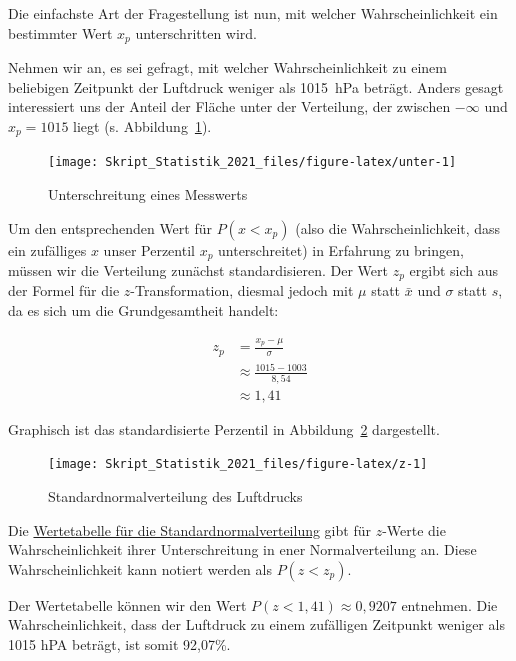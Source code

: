 \documentclass[
  11pt,
  ngerman,
  a4paper,
]{report}
\begin{document}
Die einfachste Art der Fragestellung ist nun, mit welcher Wahrscheinlichkeit ein bestimmter Wert \(x_p\) unterschritten wird.

Nehmen wir an, es sei gefragt, mit welcher Wahrscheinlichkeit zu einem beliebigen Zeitpunkt der Luftdruck weniger als 1015~hPa beträgt. Anders gesagt interessiert uns der Anteil der Fläche unter der Verteilung, der zwischen \(-\infty\) und \(x_p=1015\) liegt (s. Abbildung~\ref{fig:unter}).

\begin{figure}[H]

{\centering \texttt{[image: Skript\_Statistik\_2021\_files/figure-latex/unter-1]} 

}

\caption{Unterschreitung eines Messwerts}\label{fig:unter}
\end{figure}

Um den entsprechenden Wert für \(P(x < x_p)\) (also die Wahrscheinlichkeit, dass ein zufälliges \(x\) unser Perzentil \(x_p\) unterschreitet) in Erfahrung zu bringen, müssen wir die Verteilung zunächst standardisieren. Der Wert \(z_p\) ergibt sich aus der Formel für die \(z\)-Transformation, diesmal jedoch mit \(\mu\) statt \(\bar{x}\) und \(\sigma\) statt \(s\), da es sich um die Grundgesamtheit handelt:

\[\begin{aligned}
    z_p &= \frac{x_p-\mu}{\sigma} \\[4pt]
        &\approx \frac{1015-1003}{8{,}54}\\[4pt]
        &\approx 1{,}41
  \end{aligned}
\]

Graphisch ist das standardisierte Perzentil in Abbildung~\ref{fig:z} dargestellt.

\begin{figure}[H]

{\centering \texttt{[image: Skript\_Statistik\_2021\_files/figure-latex/z-1]} 

}

\caption{Standardnormalverteilung des Luftdrucks}\label{fig:z}
\end{figure}

Die \protect\hyperlink{tabelle-z}{Wertetabelle für die Standardnormalverteilung} gibt für \(z\)-Werte die Wahrscheinlichkeit ihrer Unterschreitung in ener Normalverteilung an. Diese Wahrscheinlichkeit kann notiert werden als \(P(z < z_p)\).

Der Wertetabelle können wir den Wert \(P(z < 1{,}41) \approx 0{,}9207\) entnehmen. Die Wahrscheinlichkeit, dass der Luftdruck zu einem zufälligen Zeitpunkt weniger als 1015 hPA beträgt, ist somit 92,07\%.
\end{document}
